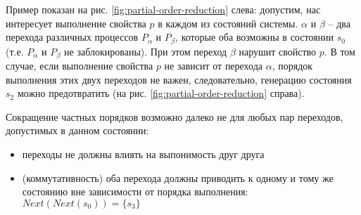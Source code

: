 Пример показан на рис. \ref{fig:partial-order-reduction} слева:
допустим, нас интересует выполнение свойства $p$ в каждом из состояний
системы. $\alpha$ и $\beta$ -- два перехода различных процессов
$P_{\alpha}$ и $P_{\beta}$, которые оба возможны в состоянии $s_0$
(т.е. $P_{\alpha}$ и $P_{\beta}$ не заблокированы). При этом переход
$\beta$ нарушит свойство $p$. В том случае, если выполнение свойства
$p$ не зависит от перехода $\alpha$, порядок выполнения этих двух
переходов не важен, следовательно, генерацию состояния $s_2$ можно
предотвратить (на рис. \ref{fig:partial-order-reduction} справа).

    
    

Сокращение частных порядков возможно далеко не для любых пар
переходов, допустимых в данном состоянии:

\begin{itemize}
\item переходы не должны влиять на выпонимость друг друга
\item (коммутативность) оба перехода должны приводить к одному и тому же состоянию
  вне зависимости от порядка выполнения: $Next(Next(s_0)) = \{ s_3 \}$
\end{itemize}

